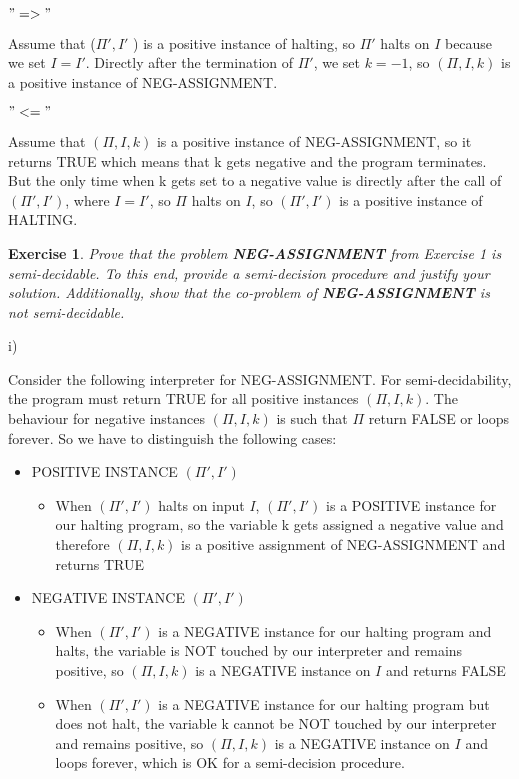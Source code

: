 \documentclass [11pt]{article}
\newtheorem{exercise}[theorem]{Exercise}
\newcommand{\solution}[1]{\noindent {\bf Solution.}  #1}
\begin{document}
\bigskip


$"=>"$

\bigskip

Assume that ($\Pi', I'$ ) is a positive instance of halting, so $\Pi'$ halts on $I$ because we set $I = I'$. Directly after the termination of $\Pi'$, we set $k=-1$, so $(\Pi, I, k)$ is a positive instance of NEG-ASSIGNMENT. 

\bigskip

$"<="$

\bigskip

Assume that $(\Pi, I, k)$ is a positive instance of NEG-ASSIGNMENT, so it returns TRUE which means that k gets negative and the program terminates. But the only time when k gets set to a negative value is directly after the call of $(\Pi', I')$, where $I=I'$, so $\Pi$ halts on $I$, so $(\Pi', I')$ is a positive instance of HALTING. 

\bigskip

\begin{exercise}
  Prove that the problem \textbf{NEG-ASSIGNMENT} from Exercise 1 is semi-decidable. 
To this end, provide a semi-decision procedure and justify your solution. Additionally,  show that the co-problem of \textbf{NEG-ASSIGNMENT} is not semi-decidable.
\end{exercise}

\solution i)

Consider the following interpreter for NEG-ASSIGNMENT. For semi-decidability, the program must return TRUE for all positive instances $(\Pi, I, k)$. The behaviour for negative instances $(\Pi, I, k)$ is such that $\Pi$ return FALSE or loops forever.
So we have to distinguish the following cases:

\begin{itemize}
\item POSITIVE INSTANCE $(\Pi', I')$
\begin{itemize}
\item When $(\Pi', I')$ halts on input $I$, $(\Pi', I')$ is a POSITIVE instance for our halting program, so the variable k gets assigned a negative value and therefore $(\Pi, I, k)$ is a positive assignment of NEG-ASSIGNMENT and returns TRUE
\end{itemize}
\item NEGATIVE INSTANCE $(\Pi', I')$
\begin{itemize}
\item  When $(\Pi', I')$ is a  NEGATIVE instance for our halting program and halts, the variable is NOT touched by our interpreter and remains positive, so $(\Pi, I, k)$ is a NEGATIVE instance on $I$ and returns FALSE
\item When $(\Pi', I')$ is a  NEGATIVE instance for our halting program but does not halt, the variable k cannot be NOT touched by our interpreter and remains positive, so $(\Pi, I, k)$ is a NEGATIVE instance on $I$ and loops forever, which is OK for a semi-decision procedure.
\end{itemize}
\end{itemize}
\end{document}
